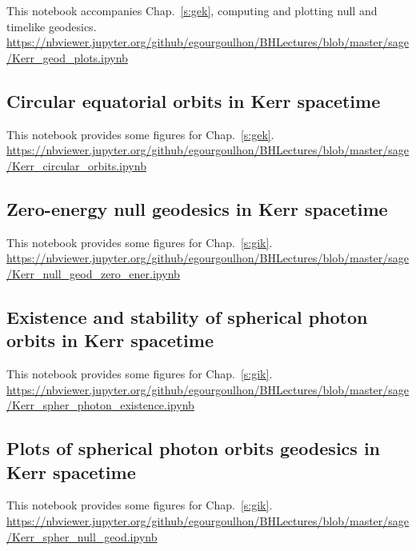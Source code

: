 This notebook accompanies Chap.~\ref{s:gek}, computing and plotting null and timelike geodesics.\\[1ex]
{\footnotesize
\url{https://nbviewer.jupyter.org/github/egourgoulhon/BHLectures/blob/master/sage/Kerr_geod_plots.ipynb}
}

\subsection{Circular equatorial orbits in Kerr spacetime} \label{s:sam:Kerr_circular_orbits}

This notebook provides some figures for Chap.~\ref{s:gek}.\\[1ex]
{\footnotesize
\url{https://nbviewer.jupyter.org/github/egourgoulhon/BHLectures/blob/master/sage/Kerr_circular_orbits.ipynb}
}

\subsection{Zero-energy null geodesics in Kerr spacetime} \label{s:sam:Kerr_null_geod_zero_ener}

This notebook provides some figures for Chap.~\ref{s:gik}.\\[1ex]
{\footnotesize
\url{https://nbviewer.jupyter.org/github/egourgoulhon/BHLectures/blob/master/sage/Kerr_null_geod_zero_ener.ipynb}
}

\subsection{Existence and stability of spherical photon orbits in Kerr spacetime} \label{s:sam:Kerr_spher_photon_existence}

This notebook provides some figures for Chap.~\ref{s:gik}.\\[1ex]
{\footnotesize
\url{https://nbviewer.jupyter.org/github/egourgoulhon/BHLectures/blob/master/sage/Kerr_spher_photon_existence.ipynb}
}

\subsection{Plots of spherical photon orbits geodesics in Kerr spacetime}
\label{s:sam:Kerr_spher_null_geod}

This notebook provides some figures for Chap.~\ref{s:gik}.\\[1ex]
{\footnotesize
\url{https://nbviewer.jupyter.org/github/egourgoulhon/BHLectures/blob/master/sage/Kerr_spher_null_geod.ipynb}
}

